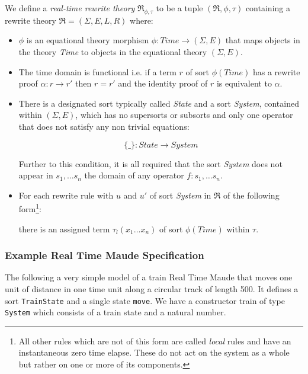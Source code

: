 \begin{mydef}
We define a \emph{real-time rewrite theory} $\mathfrak{R}_{\phi,\tau}$ to be a tuple $(\mathfrak{R}, \phi,\tau)$ containing a rewrite theory $\mathfrak{R} = (\Sigma, E,L,R) $ where:

\begin{itemize}
\item $\phi$ is an equational theory morphism $\phi : \mathit{Time} \to (\Sigma, E)$ that maps objects in the theory \textit{Time} to objects in the equational theory $(\Sigma , E)$.

\item The time domain is functional i.e. if a term $r$ of sort $\phi(Time)$  has a rewrite proof $\alpha: r \to r'$ then $r = r'$ and the identity proof of $r$ is equivalent to $\alpha$.

\item There is a designated sort typically called \textit{State} and a sort \textit{System}, contained within $(\Sigma, E)$, which has no supersorts or subsorts and only one operator that does not satisfy any non trivial equations:

$$\{\_\}: State \to System$$

Further to this condition, it is all required that the sort \textit{System} does not appear in $s_1, \ldots s_n$ the domain  of  any operator $f: s_1, \ldots s_n$.

\item For each rewrite rule with $u$ and $u'$ of sort \textit{System} in $\mathfrak{R}$ of the following form\footnote{All other rules which are not of this form are called \emph{local} rules and have an instantaneous zero time elapse. These do not act on the system as a whole but rather on one or more of its components.}:

there is an assigned term $\tau_l(x_1 \ldots x_n)$ of sort $\phi(Time)$ within $\tau$.

\end{itemize}
\end{mydef}
 
\subsubsection*{Example Real Time Maude Specification}
The following a very simple model of a train Real Time Maude that moves one unit of distance in one time unit along a circular track of length 500. It defines a sort \texttt{TrainState} and a single state \texttt{move}. We have a constructor train of type \texttt{System} which consists of a train state and a natural number.  


